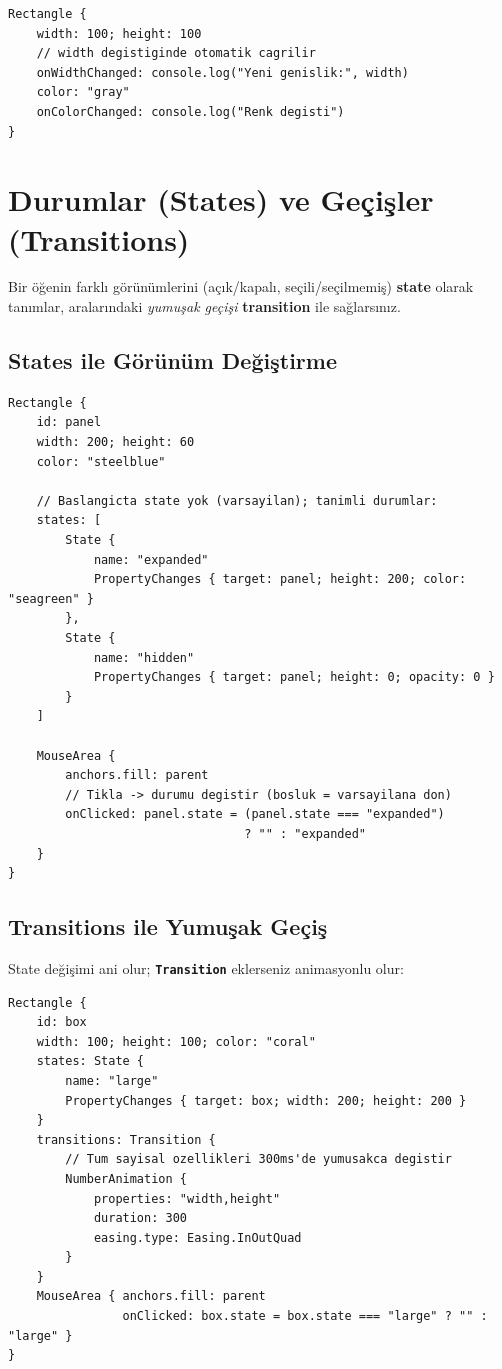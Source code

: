 \documentclass[11pt,a4paper]{article}
\newcommand{\kls}[1]{\texttt{\color{anaMavi}\textbf{#1}}}
\begin{document}
\begin{lstlisting}
Rectangle {
    width: 100; height: 100
    // width degistiginde otomatik cagrilir
    onWidthChanged: console.log("Yeni genislik:", width)
    color: "gray"
    onColorChanged: console.log("Renk degisti")
}
\end{lstlisting}

\section{Durumlar (States) ve Geçişler (Transitions)}

Bir öğenin farklı görünümlerini (açık/kapalı, seçili/seçilmemiş) \textbf{state}
olarak tanımlar, aralarındaki \emph{yumuşak geçişi} \textbf{transition} ile
sağlarsınız.

\subsection{States ile Görünüm Değiştirme}

\begin{lstlisting}
Rectangle {
    id: panel
    width: 200; height: 60
    color: "steelblue"

    // Baslangicta state yok (varsayilan); tanimli durumlar:
    states: [
        State {
            name: "expanded"
            PropertyChanges { target: panel; height: 200; color: "seagreen" }
        },
        State {
            name: "hidden"
            PropertyChanges { target: panel; height: 0; opacity: 0 }
        }
    ]

    MouseArea {
        anchors.fill: parent
        // Tikla -> durumu degistir (bosluk = varsayilana don)
        onClicked: panel.state = (panel.state === "expanded")
                                 ? "" : "expanded"
    }
}
\end{lstlisting}

\subsection{Transitions ile Yumuşak Geçiş}

State değişimi ani olur; \kls{Transition} eklerseniz animasyonlu olur:

\begin{lstlisting}
Rectangle {
    id: box
    width: 100; height: 100; color: "coral"
    states: State {
        name: "large"
        PropertyChanges { target: box; width: 200; height: 200 }
    }
    transitions: Transition {
        // Tum sayisal ozellikleri 300ms'de yumusakca degistir
        NumberAnimation {
            properties: "width,height"
            duration: 300
            easing.type: Easing.InOutQuad
        }
    }
    MouseArea { anchors.fill: parent
                onClicked: box.state = box.state === "large" ? "" : "large" }
}
\end{lstlisting}
\end{document}
